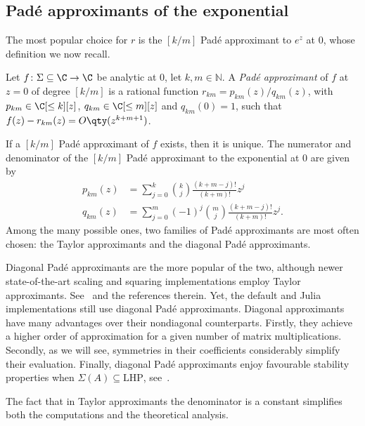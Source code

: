 \subsection{Padé approximants of the exponential}
The most popular choice for $r$ is the $[k/m]$ Padé approximant to $e^{z}$ at $0$, whose definition we now recall.
\begin{definizione}\label{def:pade_apprx_exp}
	Let $f\colon\Sigma\subseteq\C\to\C$ be analytic at $0$, let $k,m\in\mathbb{N}$.	
	A \emph{Padé approximant} of $f$ at $z=0$ of degree $[k/m]$ is a rational function $r_{km}=p_{km}(z)/q_{km}(z)$, with $p_{km}\in\C[\le k][z]$, $q_{km}\in\C[\le m][z]$ and $q_{km}(0)=1$, such that $f(z)-r_{km}(z)=O\qty(z^{k+m+1})$.
\end{definizione} 
If a $[k/m]$ Padé approximant of $f$ exists, then it is unique. The numerator and denominator of the $[k/m]$ Padé approximant to the exponential at $0$ are given by
\begin{equation}\label{eqn:pade_p_q_formulas}
\begin{aligned}
	p_{km}(z) &= \sum_{j=0}^k\binom{k}{j}\frac{(k+m-j)!}{(k+m)!}z^j\\
	q_{km}(z) &= \sum_{j=0}^m(-1)^j\binom{m}{j}\frac{(k+m-j)!}{(k+m)!}z^j.
\end{aligned}
\end{equation}
Among the many possible ones, two families of Padé approximants are most often chosen: the Taylor approximants and the diagonal Padé approximants. 

Diagonal Padé approximants are the more popular of the two, although newer state-of-the-art scaling and squaring implementations employ Taylor approximants. See~\cite{sastre:boosting_19:expm} and the references therein. Yet, the default \matlab{} and Julia implementations still use diagonal Padé approximants.
Diagonal approximants have many advantages over their nondiagonal counterparts. Firstly, they achieve a higher order of approximation for a given number of matrix multiplications. Secondly, as we will see, symmetries in their coefficients considerably simplify their evaluation. Finally, diagonal Padé approximants enjoy favourable stability properties when $\Sigma(A)\subseteq\mathrm{LHP}$, see~\cite[§~3, Method 2]{moler_vanloan:19_dubious_ways, moler_vanloan:19_dubious_ways_25yrs}.
\smallskip

The fact that in Taylor approximants the denominator is a constant simplifies both the computations and the theoretical analysis. 

